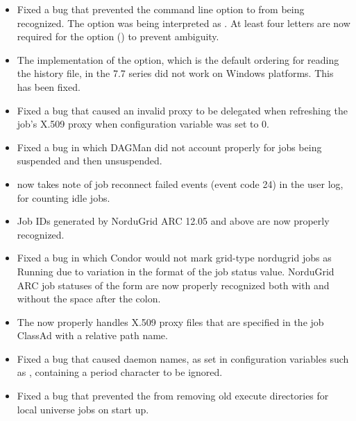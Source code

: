 \begin{itemize}
\item Fixed a bug that prevented the  command line option to
 from being recognized.
The  option was being interpreted as . 
At least four letters are now required for the  option
() to prevent ambiguity.

\item The implementation of the   option, 
which is the default ordering for reading the history file,
in the 7.7 series did not work on Windows platforms.
This has been fixed.

\item Fixed a bug that caused an invalid proxy to be delegated when
refreshing the job's X.509 proxy when configuration variable
 was set to 0.

\item Fixed a bug in which DAGMan did not account properly for jobs being
suspended and then unsuspended.

\item {} now takes note of job reconnect failed 
events (event code 24) in the user log, for counting idle jobs.

\item Job IDs generated by NorduGrid ARC 12.05 and above are now
properly recognized.

\item Fixed a bug in which Condor would not mark grid-type nordugrid jobs
as Running due to variation in the format of the job status value.
NorduGrid ARC job statuses of the form  are now
properly recognized both with and without the space after the colon.

\item The  now properly handles X.509 proxy files
that are specified in the job ClassAd with a relative path name.

\item Fixed a bug that caused daemon names,
as set in configuration variables such as ,
containing a period character to be ignored.

\item Fixed a bug that prevented the  from removing old
execute directories for local universe jobs on start up.


\end{itemize}
